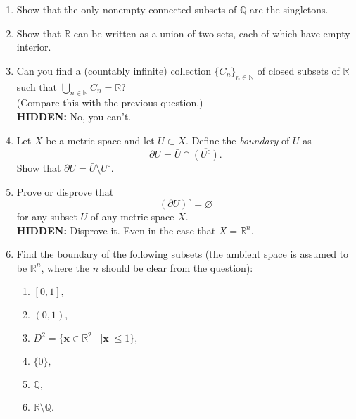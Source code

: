\documentclass[12pt]{article}
\theoremstyle{definition}
\numberwithin{thm}{section}
\let\emptyset\varnothing
\newcommand{\hint}[1]{\textbf{HIDDEN:} {\color[rgb]{0.95, 0.95, 0.95}#1}}
\begin{document}
\begin{enumerate}
\begin{enumerate}
		\item Give an example of a compact subset of $\mathbb{Q}$ which is not connected.\\
		\hint{One such is $\{0\} \cup \left\{n^{-1} : n \in \mathbb{N}\right\}.$}
		\item Can you give an example of a connected subset of $\mathbb{Q}$ which is not compact?\\
		\hint{The next question might be helpful.}
	\end{enumerate}
	\item Show that the only nonempty connected subsets of $\mathbb{Q}$ are the singletons.
	\item Show that $\mathbb{R}$ can be written as a union of two sets, each of which have empty interior.
	\item Can you find a (countably infinite) collection $\{C_n\}_{n \in \mathbb{N}}$ of closed subsets of $\mathbb{R}$ such that $\displaystyle\bigcup_{n \in \mathbb{N}}C_n = \mathbb{R}?$\\
	(Compare this with the previous question.)\\
	\hint{No, you can't.}
	\item Let $X$ be a metric space and let $U \subset X.$ Define the \emph{boundary} of $U$ as 
	\begin{equation*} 
		\partial U = \bar{U} \cap \overline{(U^c)}.
	\end{equation*}
	Show that $\partial U = \bar{U} \setminus U^\circ.$
	\item Prove or disprove that
	\begin{equation*} 
		(\partial U)^\circ = \emptyset
	\end{equation*}
	for any subset $U$ of any metric space $X.$\\
	\hint{Disprove it. Even in the case that $X = \mathbb{R}^n.$}
	\item Find the boundary of the following subsets (the ambient space is assumed to be $\mathbb{R}^n$, where the $n$ should be clear from the question):
	\begin{enumerate}
		\item $[0, 1],$
		\item $(0, 1),$
		\item $D^2 = \{\mathbf{x} \in \mathbb{R}^2 \mid \left|\mathbf{x}\right| \le 1\},$
		\item $\{0\},$
		\item $\mathbb{Q},$
		\item $\mathbb{R}\setminus\mathbb{Q}.$
	\end{enumerate}

\end{enumerate}
\end{document}
